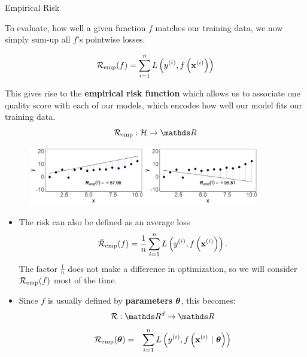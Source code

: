 \documentclass[11pt,compress,t,notes=noshow, xcolor=table]{beamer}
\begin{document}
\begin{vbframe}{Empirical Risk}

To evaluate, how well a given function $f$ matches our training data,
we now simply sum-up all $f$'s pointwise losses.

$$ \mathcal{R}_{\text{emp}}(f) = \sum\limits_{i=1}^n L\left(y^{(i)}, f\left(\mathbf{x}^{(i)}\right)\right) $$

This gives rise to the \textbf{empirical risk function} which allows us
to associate one quality score with each of our models,
which encodes how well our model fits our training data.
$$ \riske:  \Hspace \to \R $$
\begin{center}
\begin{figure}[!b]
\includegraphics[width=0.9\textwidth]{figure/ml-basic_riskmin-2-risk.png}
\end{figure}
\end{center}

\framebreak

\begin{itemize}
\item The risk can also be defined as an average loss
  $$
    \bar{\mathcal{R}}_{\text{emp}}(f) = \frac{1}{n}\sum\limits_{i=1}^n L\left(y^{(i)}, f\left(\mathbf{x}^{(i)}\right)\right).
  $$
  The factor $\frac{1}{n}$ does not make a difference in optimization, so we will consider $\mathcal{R}_{\text{emp}}(f)$ most of the time.
\item Since $f$ is usually defined by \textbf{parameters} $\bm{\theta}$, this becomes:
$$\risk : \R^d \to \R$$
\begin{eqnarray*}
\mathcal{R}_{\text{emp}}(\bm{\theta}) & = & \sum\limits_{i=1}^n L\left(y^{(i)}, f\left(\mathbf{x}^{(i)} ~|~ \bm{\theta}\right)\right) \cr
\end{eqnarray*}


\end{itemize}


\end{vbframe}
\end{document}
